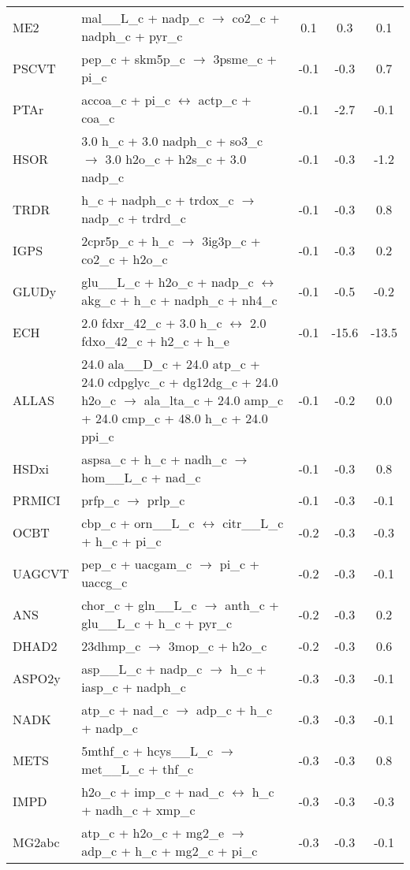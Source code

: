 \begin{longtable}{lp{}ccc}
ME2	&	mal\_\_L\_c + nadp\_c $\rightarrow$ co2\_c + nadph\_c + pyr\_c	&	0.1	&	0.3	&	0.1	\\
PSCVT	&	pep\_c + skm5p\_c $\rightarrow$ 3psme\_c + pi\_c	&	-0.1	&	-0.3	&	0.7	\\
PTAr	&	accoa\_c + pi\_c $\leftrightarrow$ actp\_c + coa\_c	&	-0.1	&	-2.7	&	-0.1	\\
HSOR	&	3.0 h\_c + 3.0 nadph\_c + so3\_c $\rightarrow$ 3.0 h2o\_c + h2s\_c + 3.0 nadp\_c	&	-0.1	&	-0.3	&	-1.2	\\
TRDR	&	h\_c + nadph\_c + trdox\_c $\rightarrow$ nadp\_c + trdrd\_c	&	-0.1	&	-0.3	&	0.8	\\
IGPS	&	2cpr5p\_c + h\_c $\rightarrow$ 3ig3p\_c + co2\_c + h2o\_c	&	-0.1	&	-0.3	&	0.2	\\
GLUDy	&	glu\_\_L\_c + h2o\_c + nadp\_c $\leftrightarrow$ akg\_c + h\_c + nadph\_c + nh4\_c	&	-0.1	&	-0.5	&	-0.2	\\
ECH	&	2.0 fdxr\_42\_c + 3.0 h\_c $\leftrightarrow$ 2.0 fdxo\_42\_c + h2\_c + h\_e	&	-0.1	&	-15.6	&	-13.5	\\
ALLAS	&	24.0 ala\_\_D\_c + 24.0 atp\_c + 24.0 cdpglyc\_c + dg12dg\_c + 24.0 h2o\_c $\rightarrow$ ala\_lta\_c + 24.0 amp\_c + 24.0 cmp\_c + 48.0 h\_c + 24.0 ppi\_c	&	-0.1	&	-0.2	&	0.0	\\
HSDxi	&	aspsa\_c + h\_c + nadh\_c $\rightarrow$ hom\_\_L\_c + nad\_c	&	-0.1	&	-0.3	&	0.8	\\
PRMICI	&	prfp\_c $\rightarrow$ prlp\_c	&	-0.1	&	-0.3	&	-0.1	\\
OCBT	&	cbp\_c + orn\_\_L\_c $\leftrightarrow$ citr\_\_L\_c + h\_c + pi\_c	&	-0.2	&	-0.3	&	-0.3	\\
UAGCVT	&	pep\_c + uacgam\_c $\rightarrow$ pi\_c + uaccg\_c	&	-0.2	&	-0.3	&	-0.1	\\
ANS	&	chor\_c + gln\_\_L\_c $\rightarrow$ anth\_c + glu\_\_L\_c + h\_c + pyr\_c	&	-0.2	&	-0.3	&	0.2	\\
DHAD2	&	23dhmp\_c $\rightarrow$ 3mop\_c + h2o\_c	&	-0.2	&	-0.3	&	0.6	\\
ASPO2y	&	asp\_\_L\_c + nadp\_c $\rightarrow$ h\_c + iasp\_c + nadph\_c	&	-0.3	&	-0.3	&	-0.1	\\
NADK	&	atp\_c + nad\_c $\rightarrow$ adp\_c + h\_c + nadp\_c	&	-0.3	&	-0.3	&	-0.1	\\
METS	&	5mthf\_c + hcys\_\_L\_c $\rightarrow$ met\_\_L\_c + thf\_c	&	-0.3	&	-0.3	&	0.8	\\
IMPD	&	h2o\_c + imp\_c + nad\_c $\leftrightarrow$ h\_c + nadh\_c + xmp\_c	&	-0.3	&	-0.3	&	-0.3	\\
MG2abc	&	atp\_c + h2o\_c + mg2\_e $\rightarrow$ adp\_c + h\_c + mg2\_c + pi\_c	&	-0.3	&	-0.3	&	-0.1	\\

\end{longtable}
